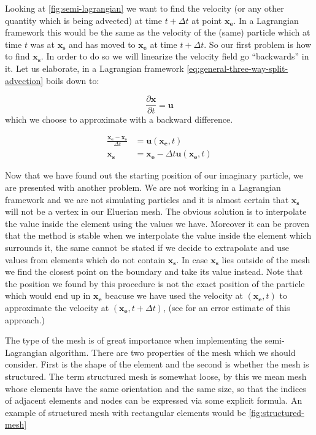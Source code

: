 Looking at \cref{fig:semi-lagrangian} we want to find the velocity (or any other quantity which is being advected) at time $t + \Delta t$ at point $\mathbf{x_e}$. In a Lagrangian framework this would be the same as the velocity of the (same) particle which at time $t$ was at $\mathbf{x_s}$ and has moved to $\mathbf{x_e}$ at time $t + \Delta t$. So our first problem is how to find $\mathbf{x_s}$. In order to do so we will linearize the velocity field go ``backwards'' in it. Let us elaborate, in a Lagrangian framework \cref{eq:general-three-way-split-advection} boils down to:

\begin{equation*}
	\frac{\partial\mathbf{x}}{\partial t} = \mathbf{u}
\end{equation*}
which we choose to approximate with a backward difference.

\begin{align*}
	\frac{\mathbf{x_e} - \mathbf{x_s}}{\Delta t} &= \mathbf{u}(\mathbf{x_e}, t) \\
	\mathbf{x_s} &= \mathbf{x_e} - \Delta t \mathbf{u}(\mathbf{x_e}, t)
\end{align*}

Now that we have found out the starting position of our imaginary particle, we are presented with another problem. We are not working in a Lagrangian framework and we are not simulating particles and it is almost certain that $\mathbf{x_s}$ will not be a vertex in our Eluerian mesh. The obvious solution is to interpolate the value inside the element using the values we have. Moreover it can be proven \cite{semi-lagrangian-stability} that the method is stable when we interpolate the value inside the element which surrounds it, the same cannot be stated if we decide to extrapolate and use values from elements which do not contain $\mathbf{x_s}$. In case $\mathbf{x_s}$ lies outside of the mesh we find the closest point on the boundary and take its value instead. Note that the position we found by this procedure is not the exact position of the particle which would end up in $\mathbf{x_e}$ beacuse we have used the velocity at $(\mathbf{x_e}, t)$ to approximate the velocity at $(\mathbf{x_e}, t + \Delta t)$, (see \cite{semi-lagrangian-stability} for an error estimate of this approach.)

The type of the mesh is of great importance when implementing the semi-Lagrangian algorithm. There are two properties of the mesh which we should consider. First is the shape of the element and the second is whether the mesh is structured. The term structured mesh is somewhat loose, by this we mean mesh whose elements have the same orientation and the same size, so that the indices of adjacent elements and nodes can be expressed via some explicit formula. An example of structured mesh with rectangular elements would be \cref{fig:structured-mesh}

